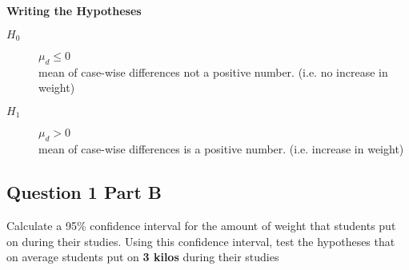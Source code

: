 \documentclass[a4paper,12pt]{article}
\begin{document}
\noindent \textbf{Writing the Hypotheses}
\begin{description}
\item[$H_0$] $\mu_d \leq 0$ \\mean of case-wise differences not a positive number. (i.e. no increase in weight)
\item[$H_1$] $\mu_d > 0$ \\mean of case-wise differences is a positive number. (i.e. increase in weight)
\end{description}


\subsection*{Question 1 Part B}
Calculate a 95\% confidence interval for the amount of weight that students put on during their studies. Using this confidence interval, test the hypotheses that on average students put on \textbf{3 kilos} during their studies

\end{document}
